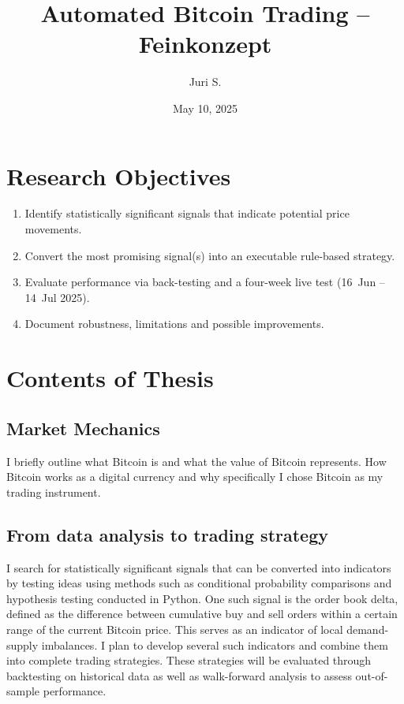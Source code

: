 \documentclass[12pt,a4paper]{article}
\title{Automated Bitcoin Trading – Feinkonzept}
\author{Juri S.}
\date{May 10, 2025}
\begin{document}
\maketitle
\tableofcontents
\newpage

\section{Research Objectives}
\begin{enumerate}
  \item Identify statistically significant signals that indicate potential price movements.
  \item Convert the most promising signal(s) into an executable rule-based strategy.
  \item Evaluate performance via back-testing and a four-week live test (16~Jun – 14~Jul 2025).
  \item Document robustness, limitations and possible improvements.
\end{enumerate}

\section{Contents of Thesis}
\subsection{Market Mechanics}
I briefly outline what Bitcoin is and what the value of Bitcoin represents. How Bitcoin works as a digital currency and why specifically I chose Bitcoin as my trading instrument.


\subsection{From data analysis to trading strategy}
I search for statistically significant signals that can be converted into indicators by testing ideas using methods such as conditional probability comparisons and hypothesis testing conducted in Python. One such signal is the order book delta, defined as the difference between cumulative buy and sell orders within a certain range of the current Bitcoin price. This serves as an indicator of local demand-supply imbalances.
I plan to develop several such indicators and combine them into complete trading strategies. These strategies will be evaluated through backtesting on historical data as well as walk-forward analysis to assess out-of-sample performance.
\end{document}
